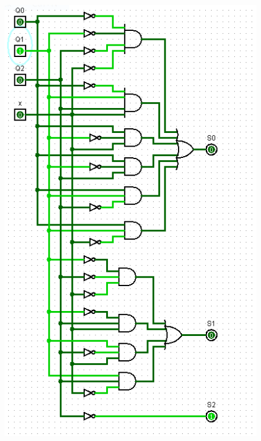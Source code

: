 \documentclass[]{article}
\begin{document}
\begin{minipage}{0.5\textwidth}
\begin{figure}[H]
	\centering
	\includegraphics[width=1\textwidth]{test0_2.png}
\end{figure}
\end{minipage}
\end{document}
